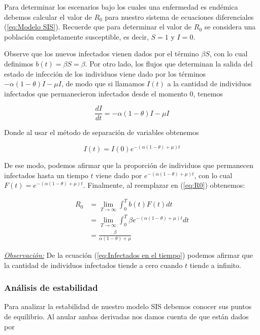 Para determinar los escenarios bajo los cuales una enfermedad es endémica debemos calcular el valor de $R_0$ para nuestro sistema de ecuaciones diferenciales (\ref{eq:Modelo SIS}). Recuerde que para determinar el valor de $R_0$ se considera una población completamente susceptible, es decir, $S=1$ y $I=0$.

Observe que los nuevos infectados vienen dados por el término $\beta S$, con lo cual definimos $b(t) = \beta S = \beta$. Por otro lado, los flujos que determinan la salida del estado de infección de los individuos viene dado por los términos $-\alpha(1-\theta)I-\mu I$, de modo que si llamamos $I(t)$ a la cantidad de individuos infectados que permanecieron infectados desde el momento 0, tenemos

\begin{equation}\label{eq:Cambio en I}
\frac{dI}{dt} = -\alpha(1-\theta)I-\mu I
\end{equation}

Donde al usar el método de separación de variables obtenemos

\begin{equation}\label{eq:Infectados en el tiempo}
I(t) = I(0)e^{-(\alpha(1-\theta)+\mu)t}
\end{equation}

De ese modo, podemos afirmar que la proporción de individuos que permanecen infectados hasta un tiempo $t$ viene dado por $e^{-(\alpha(1-\theta)+\mu)t}$, con lo cual $F(t)=e^{-(\alpha(1-\theta)+\mu)t}$. Finalmente, al reemplazar en (\ref{eq:R0}) obtenemos:

\begin{align*}
R_0 &= \lim_{T\to\infty}\int_0^T b(t)F(t) dt \\
&= \lim_{T\to\infty}\int_0^T \beta e^{-(\alpha(1-\theta)+\mu)t} dt\\
&= \frac{\beta}{\alpha(1-\theta)+\mu}
\end{align*}

\underline{\textit{Observación:}} De la ecuación (\ref{eq:Infectados en el tiempo}) podemos afirmar que la cantidad de individuos infectados tiende a cero cuando $t$ tiende a infinito.

\subsubsection{Análisis de estabilidad}

Para analizar la estabilidad de nuestro modelo SIS debemos conocer sus puntos de equilibrio. Al anular ambas derivadas nos damos cuenta de que están dados por 

